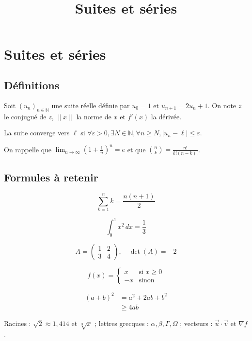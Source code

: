 \documentclass[
]{article}
\title{Suites et séries}
\author{}
\date{}
\begin{document}
\maketitle

\section{Suites et séries}\label{suites-et-suxe9ries}

\subsection{Définitions}\label{duxe9finitions}

Soit \((u_n)_{n \in \mathbb{N}}\) une suite réelle définie par
\(u_0 = 1\) et \(u_{n+1} = 2u_n + 1\). On note \(\overline{z}\) le
conjugué de \(z\), \(\|x\|\) la norme de \(x\) et \(f'(x)\) la dérivée.

La suite converge vers \(\ell\) si
\(\forall \varepsilon > 0, \exists N \in \mathbb{N}, \forall n \geq N, |u_n - \ell| \leq \varepsilon\).

On rappelle que \(\lim_{n\to\infty} \left(1+\frac{1}{n}\right)^n = e\)
et que \(\binom{n}{k} = \frac{n!}{k!(n-k)!}\).

\subsection{Formules à retenir}\label{formules-uxe0-retenir}

\[\sum_{k=1}^{n} k = \frac{n(n+1)}{2}\]

\[\int_0^1 x^2 \, dx = \frac{1}{3}\]

\[A = \begin{pmatrix} 1 & 2 \\ 3 & 4 \end{pmatrix}, \quad \det(A) = -2\]

\[f(x) = \begin{cases} x & \text{si } x \geq 0 \\ -x & \text{sinon} \end{cases}\]

\[\begin{aligned} (a+b)^2 &= a^2 + 2ab + b^2 \\ &\geq 4ab \end{aligned}\]

Racines : \(\sqrt{2} \approx 1{,}414\) et \(\sqrt[3]{x}\) ; lettres
grecques : \(\alpha, \beta, \Gamma, \Omega\) ; vecteurs :
\(\vec{u} \cdot \vec{v}\) et \(\nabla f\).
\end{document}

